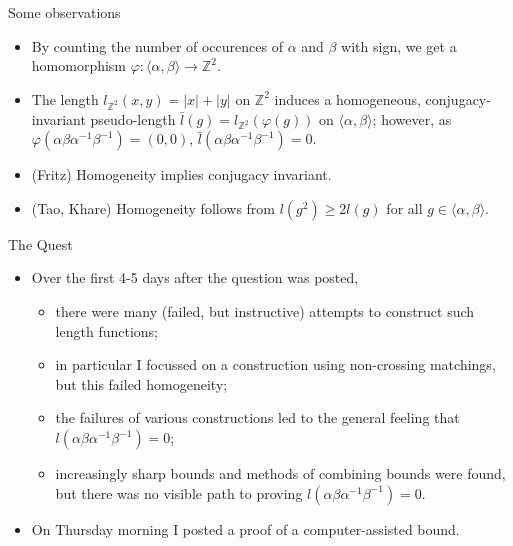 \documentclass[aspectratio=1610,17pt, ucs]{beamer}
\newcommand{\Z}{\mathbb{Z}}
\newcommand{\F}{\langle \alpha, \beta \rangle}
\newcommand{\abab}{\alpha\beta\alpha^{-1}\beta^{-1}}
\begin{document}
\begin{frame}{Some observations}
  \begin{itemize}[<+->]
    \item By counting the number of occurences of $\alpha$ and $\beta$ with sign, we get a homomorphism $\varphi : \F \to \Z^2$.
    \item The length $l_{\Z^2}(x, y) = |x| + |y|$ on $\Z^2$ 
    induces a homogeneous, conjugacy-invariant pseudo-length 
    $\bar{l}(g) = l_{\Z^2}(\varphi(g))$ on $\F$;
    however,  as $\varphi(\abab) = (0, 0)$, $\bar{l}(\alpha\beta\alpha^{-1}\beta^{-1}) = 0$.
    \item (Fritz) Homogeneity implies conjugacy invariant.
    \item (Tao, Khare) Homogeneity follows from $l(g^2) \geq 2l(g)$ for all $g\in \F$.

  \end{itemize}

\end{frame}


\begin{frame}{The Quest}
  \begin{itemize}
    \item Over the first 4-5 days after the question was posted,
    \begin{itemize}
      \item there were many (failed, but instructive) attempts to construct such length functions;
      \item\pause in particular I focussed on a construction using \alert{non-crossing matchings}, \pause but this failed homogeneity;
      \item\pause the failures of various constructions led to the general feeling that $l(\alpha\beta\alpha^{-1}\beta^{-1}) = 0$;
      \item\pause increasingly sharp bounds and methods of combining bounds were found, but there was no visible path to proving $l(\alpha\beta\alpha^{-1}\beta^{-1}) = 0$.
    \end{itemize}
    \item\pause On Thursday morning I posted a proof of a computer-assisted bound.
  \end{itemize}

\end{frame}
\end{document}
